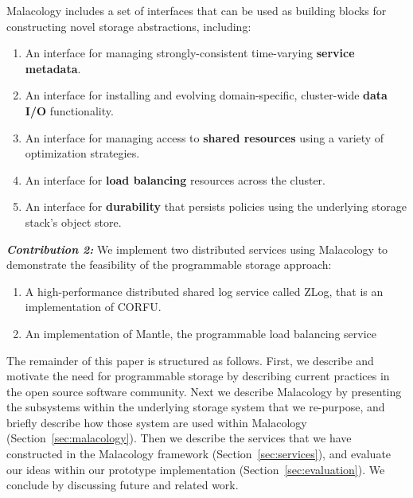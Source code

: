 Malacology includes a set of interfaces that can be used as
building blocks for constructing novel storage abstractions, including:

\begin{enumerate}

\item An interface for managing strongly-consistent time-varying
\textbf{service metadata}.

\item An interface for installing and evolving domain-specific, cluster-wide
\textbf{data I/O} functionality.

\item An interface for managing access to \textbf{shared resources} using a
variety of optimization strategies.

\item An interface for \textbf{load balancing} resources across the cluster.

\item An interface for \textbf{durability} that persists policies using the
underlying storage stack's object store.

\end{enumerate}

{\it \textbf{Contribution 2:}} We implement two distributed services using
Malacology to demonstrate the feasibility of the programmable storage approach:

\begin{enumerate}

\item A high-performance distributed shared log service called ZLog, that is an
implementation of CORFU.~\cite{balakrishnan_corfu_2012}

\item An implementation of Mantle, the programmable load balancing
service~\cite{sevilla:sc15-mantle}

\end{enumerate}

The remainder of this paper is structured as follows. First, we describe and
motivate the need for programmable storage by describing current practices in
the open source software community. Next we describe Malacology by presenting
the subsystems within the underlying storage system that we re-purpose, and
briefly describe how those system are used within Malacology
(Section~\ref{sec:malacology}).  Then we describe the services that we have
constructed in the Malacology framework (Section~\ref{sec:services}), and
evaluate our ideas within our prototype implementation
(Section~\ref{sec:evaluation}).  We conclude by discussing future and related
work.
